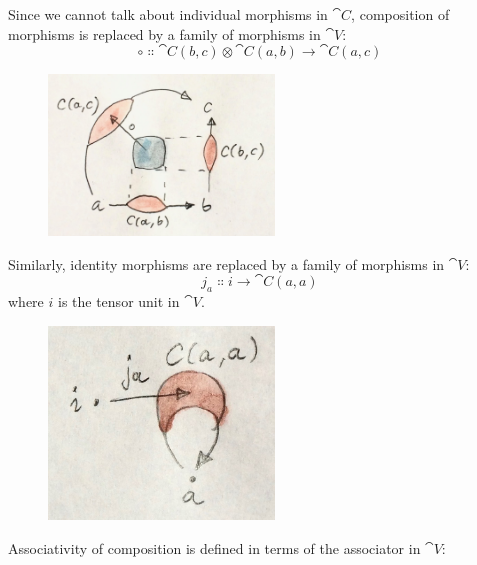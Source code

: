 Since we cannot talk about individual morphisms in $\cat{C}$, composition
of morphisms is replaced by a family of morphisms in $\cat{V}$:
\[\circ \Colon \cat{C}(b, c) \otimes \cat{C}(a, b) \to \cat{C}(a, c)\]

\begin{figure}[H]
\centering
\includegraphics[width=60mm]{images/composition.jpg}
\end{figure}

\noindent
Similarly, identity morphisms are replaced by a family of morphisms in
$\cat{V}$:
\[j_a \Colon i \to \cat{C}(a, a)\]
where $i$ is the tensor unit in $\cat{V}$.

\begin{figure}[H]
\centering
\includegraphics[width=60mm]{images/id.jpg}
\end{figure}

\noindent
Associativity of composition is defined in terms of the associator in
$\cat{V}$:

\begin{figure}[H]
\centering
{}
\end{figure}

